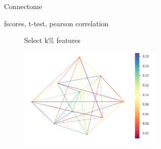 \documentclass[msthesis.tex]{subfiles}
\begin{document}
\begin{figure}
\begin{subfigure}[b]{0.4\textwidth}
         \caption{Connectome}
         \label{fig:connectivity_matrix}
        \end{subfigure}
    \vfill
        \begin{subfigure}[b]{0.6\textwidth}
         \centering
         \vspace{2em}
        \begin{tcolorbox}[box align= center,coltitle=black!75!black, colback=yellow!5!white,colframe=yellow!50!black,
  colbacktitle=yellow!80!black,title=\centering \large Feature Extraction]
        \centering
        fscores, t-test, pearson correlation
        \end{tcolorbox}
        \caption{}
         \label{fig:feature extraction}
         \end{subfigure}
    \vfill
    \begin{subfigure}[b]{0.9\textwidth}
    \begin{subfigure}[b]{0.3\textwidth}
        \begin{tcolorbox}[coltitle=black!60!black ,colback=yellow!5!white,colframe=yellow!50!black,
  colbacktitle=yellow!75!black, fontupper=\color{black}, title=\centering \large Feature Selection]
        Select k\% features
        \end{tcolorbox}
         \vspace{+1.5cm}
         \label{fig:feature selection}
         \end{subfigure}
    \hfill
    \begin{subfigure}[b]{0.4\textwidth}
         \centering
         \includegraphics[height =0.8\textwidth,width=\textwidth]{images/mews.png}

\end{subfigure}
\end{subfigure}
\end{figure}
\end{document}
